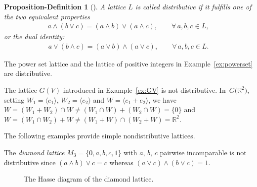 \documentclass[10pt,a4paper]{amsart}
\numberwithin{equation}{section}
\newtheorem{propdefn}[Theorem]{Proposition-Definition}
 { \theoremstyle{definition}
\newtheorem{Definition}[Theorem]{Definition}
\newtheorem{Note}[Theorem]{Note}
\newtheorem{Example}[Theorem]{Example}
\newtheorem{Remark}[Theorem]{Remark}
	\newtheorem{coex}[Theorem]{Counterexample}
}
\newcommand{\R}{\mathbb{R}}
\begin{document}
\begin{propdefn}[{\cite[Section 4, Lemma 10]{Gra2}}] \label{propdef:distrib1}
A lattice $L$ is called distributive if it fulfills one of the two equivalent properties
 \begin{gather}\label{eq:distr1}
 a\wedge (b\vee c)= (a\wedge b)\vee (a\wedge c), \qquad \forall\, a,b, c\in L,
 \end{gather}
 or the dual identity:
 \begin{gather*}%
 a\vee (b\wedge c)= (a\vee b)\wedge(a\vee c), \qquad \forall\, a,b, c\in L.
 \end{gather*}
 \end{propdefn}

 \begin{Example} The power set lattice and the lattice of positive integers in Example~\ref{ex:powerset} are distributive.
 \end{Example}

\begin{coex} \label{coex:GR2} The \subsp lattice $G(V)$ introduced in Example~\ref{ex:GV} is not distributive. In~$G\big(\R^2\big)$, setting $W_1= \langle e_1\rangle$, $W_2= \langle e_2\rangle$ and $W=\langle e_1+e_2\rangle$, we have
	$W=(W_1+ W_2)\cap W\neq (W_1\cap W)+ (W_2\cap W)=\{0\}$ and $W=(W_1 \cap W_2)+ W\neq (W_1+ W)\cap (W_2+ W)=\R^2$.
\end{coex}

The following examples provide simple nondistributive lattices.

\newpage

\begin{Example}\label{ex:diamond}
	The {\it diamond lattice} $M_3=\{0,a,b ,c,1\}$ with $a$, $b$, $c$ pairwise incomparable is not distributive since $(a\wedge b)\vee c= c$ whereas
$(a\vee c)\wedge (b\vee c)= 1$.
\begin{figure}[h!]\centering
{}
\caption{The Hasse diagram of the diamond lattice.}
\end{figure}
\end{Example}
\end{document}
